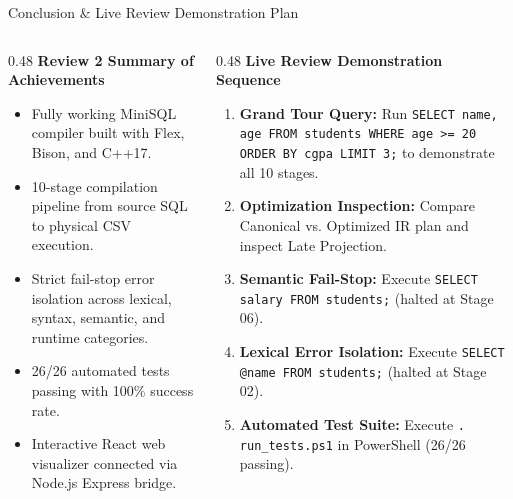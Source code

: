 \documentclass[aspectratio=169,10pt]{beamer}
\begin{document}
\begin{frame}{Conclusion \& Live Review Demonstration Plan}
    \begin{columns}[T]
        \begin{column}{0.48\textwidth}
            \textbf{Review 2 Summary of Achievements}
            \begin{itemize}\footnotesize
                \item Fully working MiniSQL compiler built with Flex, Bison, and C++17.
                \item 10-stage compilation pipeline from source SQL to physical CSV execution.
                \item Strict fail-stop error isolation across lexical, syntax, semantic, and runtime categories.
                \item 26/26 automated tests passing with 100\% success rate.
                \item Interactive React web visualizer connected via Node.js Express bridge.
            \end{itemize}
        \end{column}
        \begin{column}{0.48\textwidth}
            \textbf{Live Review Demonstration Sequence}
            \begin{enumerate}\footnotesize
                \item \textbf{Grand Tour Query:} Run \texttt{SELECT name, age FROM students WHERE age >= 20 ORDER BY cgpa LIMIT 3;} to demonstrate all 10 stages.
                \item \textbf{Optimization Inspection:} Compare Canonical vs. Optimized IR plan and inspect Late Projection.
                \item \textbf{Semantic Fail-Stop:} Execute \texttt{SELECT salary FROM students;} (halted at Stage 06).
                \item \textbf{Lexical Error Isolation:} Execute \texttt{SELECT @name FROM students;} (halted at Stage 02).
                \item \textbf{Automated Test Suite:} Execute \texttt{.\\run\_tests.ps1} in PowerShell (26/26 passing).
            \end{enumerate}
        \end{column}
    \end{columns}
\end{frame}
\end{document}
